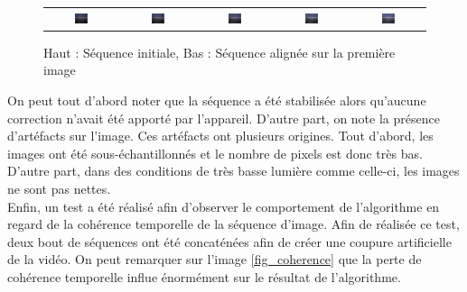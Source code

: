 \begin{figure}[H]
\begin{tabular}{ccccc}
\includegraphics[width = 0.2\textwidth]{Chapters/Images/Seq_ill_stab/2}&
\includegraphics[width = 0.2\textwidth]{Chapters/Images/Seq_ill_stab/3}&
\includegraphics[width = 0.2\textwidth]{Chapters/Images/Seq_ill_stab/4}&
\includegraphics[width = 0.2\textwidth]{Chapters/Images/Seq_ill_stab/5}&
\includegraphics[width = 0.2\textwidth]{Chapters/Images/Seq_ill_stab/6}

\end{tabular}
\caption{Haut : Séquence initiale, Bas : Séquence alignée sur la première image}
\label{fig_illum}
\end{figure}


On peut tout d'abord noter que la séquence a été stabilisée alors qu'aucune correction n'avait été apporté par l'appareil. D'autre part, on note la présence d'artéfacts sur l'image. Ces artéfacts ont plusieurs origines. Tout d'abord, les images ont été sous-échantillonnés et le nombre de pixels est donc très bas. D'autre part, dans des conditions de très basse lumière comme celle-ci, les images ne sont pas nettes.\\

Enfin, un test a été réalisé afin d'observer le comportement de l'algorithme en regard de la cohérence temporelle de la séquence d'image. Afin de réalisée ce test, deux bout de séquences ont été concaténées afin de créer une coupure artificielle de la vidéo. On peut remarquer sur l'image \ref{fig_coherence} que la perte de cohérence temporelle influe énormément sur le résultat de l'algorithme.

